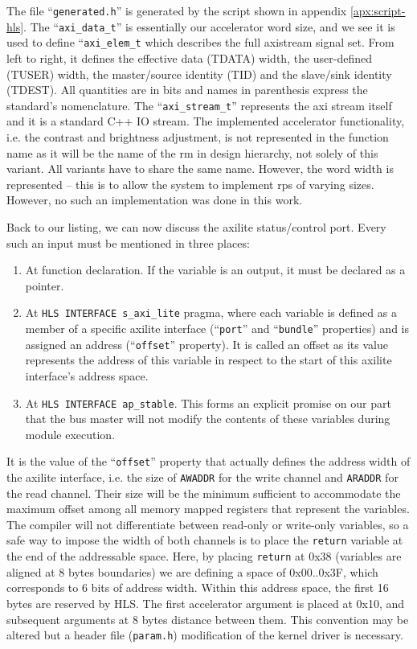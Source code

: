 The file ``\texttt{generated.h}'' is generated by the script shown in appendix \ref{apx:script-hls}.
The ``\texttt{axi\_data\_t}'' is essentially our accelerator word size, and we see it is used
to define ``\texttt{axi\_elem\_t} which describes the full \gls{axistream} signal set.
From left to right, it defines the effective data (TDATA) width, the user-defined (TUSER)
width, the master/source identity (TID) and the slave/sink identity (TDEST). All quantities are
in bits and names in parenthesis express the standard's nomenclature. 
The ``\texttt{axi\_stream\_t}'' represents the \gls{axi} stream itself 
and it is a standard C++ IO stream. The implemented accelerator functionality, 
i.e. the contrast and brightness adjustment, is not represented in the function name as it
will be the name of the \gls{rm} in design hierarchy, not solely of this variant. All variants
have to share the same name. However, the word width is represented -- this is to allow the
system to implement \glspl{rp} of varying sizes. However, no such an implementation was done
in this work.

Back to our listing, we can now discuss the \gls{axilite} status/control port.
Every such an input must be mentioned in three places:
\begin{enumerate}
\item	At function declaration. If the variable is an output, it must be declared as a pointer.
\item	At \texttt{HLS INTERFACE s\_axi\_lite} pragma, where each variable is defined
	as a member of a specific \gls{axilite} interface (``\texttt{port}'' and ``\texttt{bundle}''
	properties) and is assigned an address (``\texttt{offset}'' property). It is called an
	offset as its value represents the address of this variable in respect to the start
	of this \gls{axilite} interface's address space.
\item	At \texttt{HLS INTERFACE ap\_stable}. This forms an explicit promise on our part
	that the bus master will not modify the contents of these variables during module execution.
\end{enumerate}

It is the value of the ``\texttt{offset}'' property that actually defines the address width
of the \gls{axilite} interface, i.e. the size of \texttt{AWADDR} for the write channel
and \texttt{ARADDR} for the read channel. Their size will be the minimum sufficient
to accommodate the maximum offset among all memory mapped registers that represent the variables.
The compiler will not differentiate between read-only or write-only variables, so a safe way
to impose the width of both channels is to place the \texttt{return} variable at the end of
the addressable space. Here, by placing \texttt{return} at 0x38 (variables are aligned at 8 bytes
boundaries) we are defining a space of 0x00..0x3F, which corresponds to 6 bits of address width.
Within this address space, the first 16 bytes are reserved by HLS. The first accelerator
argument is placed at 0x10, and subsequent arguments at 8 bytes distance between them.
This convention may be altered but a header file (\texttt{param.h}) modification
of the kernel driver is necessary.

